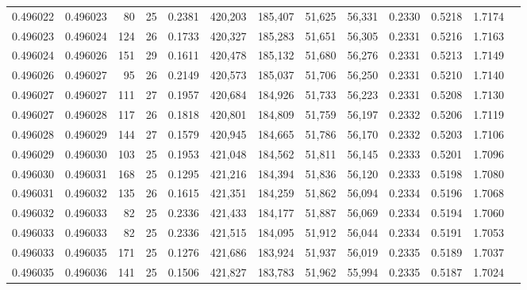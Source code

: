 \begin{tabular}{rrrrrrrrrrrrr}
0.496022 & 0.496023 &  80 &  25 &                                     0.2381 & 420,203 & 185,407 &  51,625 &  56,331 & 0.2330 & 0.5218 & 1.7174 \\
0.496023 & 0.496024 & 124 &  26 &                                     0.1733 & 420,327 & 185,283 &  51,651 &  56,305 & 0.2331 & 0.5216 & 1.7163 \\
0.496024 & 0.496026 & 151 &  29 &                                     0.1611 & 420,478 & 185,132 &  51,680 &  56,276 & 0.2331 & 0.5213 & 1.7149 \\
0.496026 & 0.496027 &  95 &  26 &                                     0.2149 & 420,573 & 185,037 &  51,706 &  56,250 & 0.2331 & 0.5210 & 1.7140 \\
0.496027 & 0.496027 & 111 &  27 &                                     0.1957 & 420,684 & 184,926 &  51,733 &  56,223 & 0.2331 & 0.5208 & 1.7130 \\
0.496027 & 0.496028 & 117 &  26 &                                     0.1818 & 420,801 & 184,809 &  51,759 &  56,197 & 0.2332 & 0.5206 & 1.7119 \\
0.496028 & 0.496029 & 144 &  27 &                                     0.1579 & 420,945 & 184,665 &  51,786 &  56,170 & 0.2332 & 0.5203 & 1.7106 \\
0.496029 & 0.496030 & 103 &  25 &                                     0.1953 & 421,048 & 184,562 &  51,811 &  56,145 & 0.2333 & 0.5201 & 1.7096 \\
0.496030 & 0.496031 & 168 &  25 &                                     0.1295 & 421,216 & 184,394 &  51,836 &  56,120 & 0.2333 & 0.5198 & 1.7080 \\
0.496031 & 0.496032 & 135 &  26 &                                     0.1615 & 421,351 & 184,259 &  51,862 &  56,094 & 0.2334 & 0.5196 & 1.7068 \\
0.496032 & 0.496033 &  82 &  25 &                                     0.2336 & 421,433 & 184,177 &  51,887 &  56,069 & 0.2334 & 0.5194 & 1.7060 \\
0.496033 & 0.496033 &  82 &  25 &                                     0.2336 & 421,515 & 184,095 &  51,912 &  56,044 & 0.2334 & 0.5191 & 1.7053 \\
0.496033 & 0.496035 & 171 &  25 &                                     0.1276 & 421,686 & 183,924 &  51,937 &  56,019 & 0.2335 & 0.5189 & 1.7037 \\
0.496035 & 0.496036 & 141 &  25 &                                     0.1506 & 421,827 & 183,783 &  51,962 &  55,994 & 0.2335 & 0.5187 & 1.7024 \\

\end{tabular}
